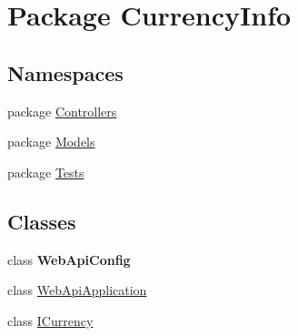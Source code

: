 \hypertarget{namespace_currency_info}{\section{Package Currency\-Info}
\label{namespace_currency_info}
}
\subsection*{Namespaces}
\begin{DoxyCompactItemize}
\item 
package \hyperlink{namespace_currency_info_1_1_controllers}{Controllers}
\item 
package \hyperlink{namespace_currency_info_1_1_models}{Models}
\item 
package \hyperlink{namespace_currency_info_1_1_tests}{Tests}
\end{DoxyCompactItemize}
\subsection*{Classes}
\begin{DoxyCompactItemize}
\item 
class {\bfseries Web\-Api\-Config}
\item 
class \hyperlink{class_currency_info_1_1_web_api_application}{Web\-Api\-Application}
\item 
class \hyperlink{class_currency_info_1_1_i_currency}{I\-Currency}
\end{DoxyCompactItemize}
